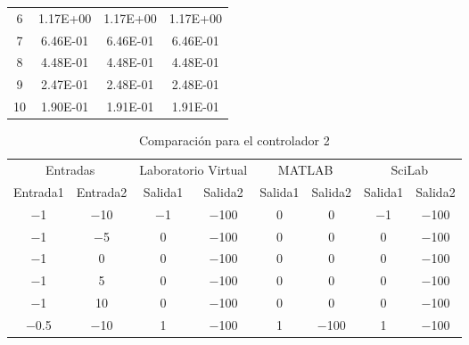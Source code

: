 {\begin{longtable}{c @{\extracolsep{\fill}} ccc}
            \num{6}   & \num{1.17E+00}  & \num{1.17E+00}  & \num{1.17E+00}   \\
            \num{7}   & \num{6.46E-01}  & \num{6.46E-01}  & \num{6.46E-01}   \\
            \num{8}   & \num{4.48E-01}  & \num{4.48E-01}  & \num{4.48E-01}   \\
            \num{9}   & \num{2.47E-01}  & \num{2.48E-01}  & \num{2.48E-01}   \\
            \num{10}  & \num{1.90E-01}  & \num{1.91E-01}  & \num{1.91E-01}   \\
        \end{longtable}}

        {\setlength\LTleft{0pt}
        \setlength\LTright{0pt}
        \centering
        \scriptsize
        \renewcommand{\arraystretch}{0.89}
        \begin{longtable}{c @{\extracolsep{\fill}} ccccccc}
            \caption[Comparación de diseño de controladores difusos - controlador 2]{Comparación para el controlador 2} 
            \label{tab:C2Difuso} \\
            \toprule
            \multicolumn{2}{c}{Entradas}& \multicolumn{2}{c}{Laboratorio Virtual} & \multicolumn{2}{c}{MATLAB} & \multicolumn{2}{c}{SciLab} \\ \cmidrule{1-2}\cmidrule{3-4}\cmidrule{5-6}\cmidrule{7-8}
            Entrada1   & Entrada2  & Salida1    & Salida2    & Salida1   & Salida2    & Salida1    & Salida2     \\ \cmidrule{1-1}\cmidrule{2-2} \cmidrule{3-3}\cmidrule{4-4}\cmidrule{5-5}\cmidrule{6-6}\cmidrule{7-7}\cmidrule{8-8} 
            \endhead
            \bottomrule
            \endfoot
            \num{-1}   & \num{-10} & \num{-1}   & \num{-100} & \num{0}   & \num{0}    & \num{-1}   & \num{-100}  \\
            \num{-1}   & \num{-5}  & \num{0}    & \num{-100} & \num{0}   & \num{0}    & \num{0}    & \num{-100}  \\
            \num{-1}   & \num{0}   & \num{0}    & \num{-100} & \num{0}   & \num{0}    & \num{0}    & \num{-100}  \\
            \num{-1}   & \num{5}   & \num{0}    & \num{-100} & \num{0}   & \num{0}    & \num{0}    & \num{-100}  \\
            \num{-1}   & \num{10}  & \num{0}    & \num{-100} & \num{0}   & \num{0}    & \num{0}    & \num{-100}  \\
            \num{-0.5} & \num{-10} & \num{1}    & \num{-100} & \num{1}   & \num{-100} & \num{1}    & \num{-100}  \\

\end{longtable}}
